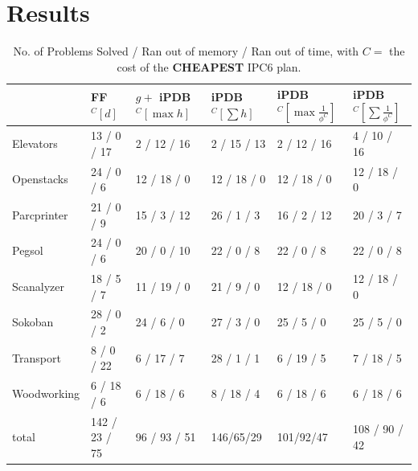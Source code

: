 \documentclass[letterpaper]{article} %
\begin{document}
\section{Results}

\begin{table}
\caption{No. of Problems Solved / Ran out of memory / Ran out of time,
with \(C =\) the cost of the \textbf{CHEAPEST} IPC6 plan.}
\label{tab:resultsBest}
\begin{tabular}{| l | l | l | l | l | l |}
\hline
             & FF\(^C[d]\)      & \(g + \) iPDB\(^C[\max{h}]\)    & iPDB\(^C[\sum{h}]\) &  iPDB\(^C[\max \frac{1}{\phi^C}]\) & iPDB\(^C[\sum \frac{1}{\phi^C}]\) \\
\hline
Elevators    & 13 / 0 / 17    & 2 / 12 / 16     & 2 / 15 / 13     & 2 / 12 / 16       & 4 / 10 / 16 \\
Openstacks   & 24 / 0 / 6     & 12 / 18 / 0     & 12 / 18 / 0     & 12 / 18 / 0       & 12 / 18 / 0 \\
Parcprinter  & 21 / 0 / 9     & 15 / 3 / 12     & 26 / 1 / 3      & 16 / 2 / 12       & 20 / 3 / 7  \\
Pegsol       & 24 / 0 / 6     & 20 / 0 / 10     & 22 / 0 / 8      & 22 / 0 / 8        & 22 / 0 / 8  \\
Scanalyzer   & 18 / 5 / 7     & 11 / 19 / 0     & 21 / 9 / 0      & 12 / 18 / 0       & 12 / 18 / 0  \\ 
Sokoban      & 28 / 0 / 2     & 24 / 6 / 0      & 27 / 3 / 0      & 25 / 5 / 0        & 25 / 5 / 0  \\
Transport    & 8 / 0 / 22     & 6 / 17 / 7      & 28 / 1 / 1      & 6 / 19 / 5        & 7 / 18 / 5   \\ 
Woodworking  & 6 / 18 / 6     & 6 / 18 / 6      & 8 / 18 / 4      & 6 / 18 / 6        & 6 / 18 / 6  \\
\hline
total        & 142 / 23 / 75  & 96 / 93 / 51    & 146/65/29   & 101/92/47     & 108 / 90 / 42  \\
\hline
\end{tabular}


\end{table}
\end{document}
